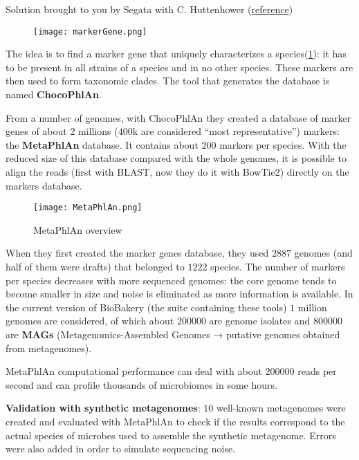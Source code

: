Solution brought to you by Segata with C. Huttenhower (\href{http://segatalab.cibio.unitn.it/tools/metaphlan/index.html}{reference})

\begin{figure}[!h]
\centering
\texttt{[image: markerGene.png]}
\caption{\label{fig:markerGene}}
\end{figure}

The idea is to find a marker gene that uniquely characterizes a species(\ref{fig:markerGene}): it has to be present in all strains of a species and in no other species. These markers are then used to form taxonomic clades. The tool that generates the database is named \textbf{ChocoPhlAn}.

From a number of genomes, with ChocoPhlAn they created a database of marker genes of about $2$ millions ($400$k are considered “most representative”) markers: the \textbf{MetaPhlAn} database. It contains about $200$ markers per species. With the reduced size of this database compared with the whole genomes, it is possible to align the reads (first with BLAST, now they do it with BowTie2) directly on the markers database. 

\begin{figure}[!h]
\centering
\texttt{[image: MetaPhlAn.png]}
\caption{\label{fig:metaphlan}MetaPhlAn overview}
\end{figure}

When they first created the marker genes database, they used $2887$ genomes (and half of them were drafts) that belonged to $1222$ species. The number of markers per species decreases with more sequenced genomes: the core genome tends to become smaller in size and noise is eliminated as more information is available. In the current version of BioBakery (the suite containing these tools) $1$ million genomes are considered, of which about $200 000$ are genome isolates and $800 000$ are \textbf{MAGs} (Metagenomics-Assembled Genomes → putative genomes obtained from metagenomes).

MetaPhlAn computational performance can deal with about $200 000$ reads per second and  can profile thousands of microbiomes in some hours. 

\textbf{Validation with synthetic metagenomes}: $10$ well-known metagenomes were created and evaluated with MetaPhlAn to check if the results correspond to the actual species of microbes used to assemble the synthetic metagenome. Errors were also added in order to simulate sequencing noise. 

